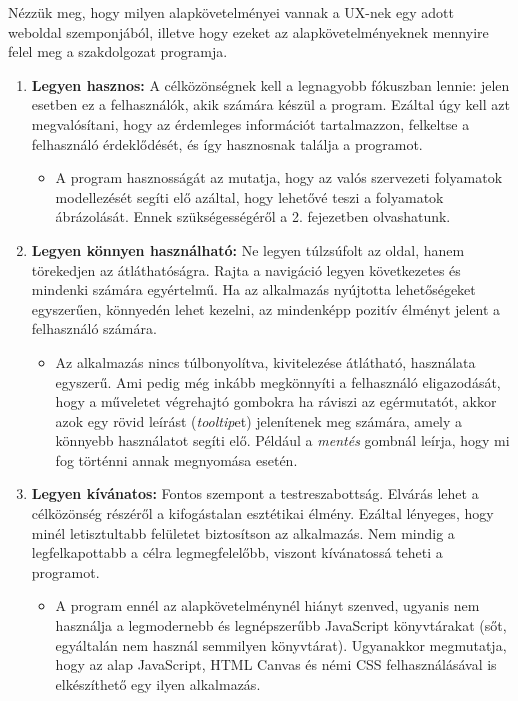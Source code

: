 
Nézzük meg, hogy milyen alapkövetelményei vannak a UX-nek egy adott weboldal szemponjából, illetve hogy ezeket az alapkövetelményeknek mennyire felel meg a szakdolgozat programja.

\begin{enumerate}
\item \textbf{Legyen hasznos:} A célközönségnek kell a legnagyobb fókuszban lennie: jelen esetben ez a felhasználók, akik számára készül a program. Ezáltal úgy kell azt megvalósítani, hogy az érdemleges információt tartalmazzon, felkeltse a felhasználó érdeklődését, és így hasznosnak találja a programot.

\begin{itemize}
\item A program hasznosságát az mutatja, hogy az valós szervezeti folyamatok modellezését segíti elő azáltal, hogy lehetővé teszi a folyamatok ábrázolását. Ennek szükségességéről a 2. fejezetben olvashatunk.
\end{itemize}

\item \textbf{Legyen könnyen használható:} Ne legyen túlzsúfolt az oldal, hanem törekedjen az átláthatóságra. Rajta a navigáció legyen következetes és mindenki számára egyértelmű. Ha az alkalmazás nyújtotta lehetőségeket egyszerűen, könnyedén lehet kezelni, az mindenképp pozitív élményt jelent a felhasználó számára.

\begin{itemize}
\item Az alkalmazás nincs túlbonyolítva, kivitelezése átlátható, használata egyszerű. Ami pedig még inkább megkönnyíti a felhasználó eligazodását, hogy a műveletet végrehajtó gombokra ha ráviszi az egérmutatót, akkor azok egy rövid leírást (\textit{tooltip}et) jelenítenek meg számára, amely a könnyebb használatot segíti elő. Például a \textit{mentés} gombnál leírja, hogy mi fog történni annak megnyomása esetén.
\end{itemize}
\item \textbf{Legyen kívánatos:} Fontos szempont a testreszabottság. Elvárás lehet a célközönség részéről a kifogástalan esztétikai élmény. Ezáltal lényeges, hogy minél letisztultabb felületet biztosítson az alkalmazás. Nem mindig a legfelkapottabb a célra legmegfelelőbb, viszont kívánatossá teheti a programot.

\begin{itemize}
\item A program ennél az alapkövetelménynél hiányt szenved, ugyanis nem használja a legmodernebb és legnépszerűbb JavaScript könyvtárakat (sőt, egyáltalán nem használ semmilyen könyvtárat). Ugyanakkor megmutatja, hogy az alap JavaScript, HTML Canvas és némi CSS felhasználásával is elkészíthető egy ilyen alkalmazás.
\end{itemize}


\end{enumerate}
